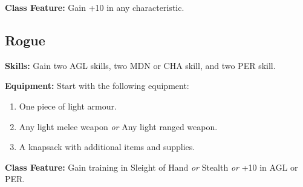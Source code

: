 \documentclass[]{article}
\providecommand{\tightlist}{%
  \setlength{\itemsep}{0pt}\setlength{\parskip}{0pt}}
\begin{document}
\textbf{Class Feature:} Gain +10 in any characteristic.

\subsection{Rogue}\label{rogue}

\textbf{Skills:} Gain two AGL skills, two MDN or CHA skill, and two PER
skill.

\textbf{Equipment:} Start with the following equipment:

\begin{enumerate}
\def\labelenumi{\arabic{enumi}.}
\tightlist
\item
  One piece of light armour.
\item
  Any light melee weapon \emph{or} Any light ranged weapon.
\item
  A knapsack with additional items and supplies.
\end{enumerate}

\textbf{Class Feature:} Gain training in Sleight of Hand \emph{or}
Stealth \emph{or} +10 in AGL or PER.
\end{document}
